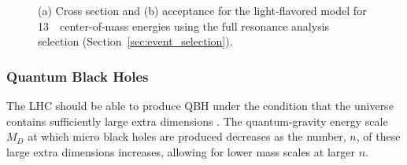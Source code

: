 \begin{figure}[!htb]
  \centering
  \caption{(a) Cross section and (b) acceptance for the 
  light-flavored \qstar model for 13~\TeV~center-of-mass energies using the full resonance
  analysis selection (Section~\ref{sec:event_selection}).}
\end{figure}

\subsubsection{Quantum Black Holes}
The LHC should be able to produce QBH under the condition that the
universe contains sufficiently large extra dimensions \cite{RandallMeade}.
The quantum-gravity energy scale $M_{D}$ at which micro black holes are produced decreases as the number, $n$,
of these large extra dimensions increases, allowing for lower mass scales at larger $n$.

